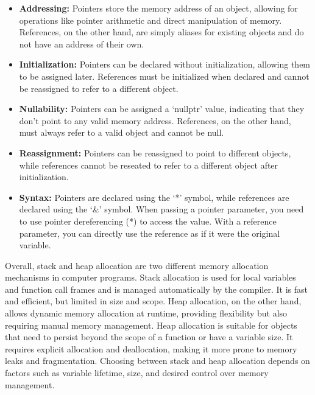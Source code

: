 \begin{itemize}
    \item \textbf{Addressing:} Pointers store the memory address of an object, allowing for operations like pointer arithmetic and direct manipulation of memory. References, on the other hand, are 
    simply aliases for existing objects and do not have an address of their own.
    \item \textbf{Initialization:} Pointers can be declared without initialization, allowing them to be assigned later. References must be initialized when declared and cannot be reassigned to refer 
    to a different object.
    \item \textbf{Nullability:} Pointers can be assigned a `nullptr' value, indicating that they don't point to any valid memory address. References, on the other hand, must always refer to a valid 
    object and cannot be null.
    \item \textbf{Reassignment:} Pointers can be reassigned to point to different objects, while references cannot be reseated to refer to a different object after initialization.
    \item \textbf{Syntax:} Pointers are declared using the `*' symbol, while references are declared using the `\&' symbol. When passing a pointer parameter, you need to use pointer dereferencing (*) 
    to access the value. With a reference parameter, you can directly use the reference as if it were the original variable.
\end{itemize}

Overall, stack and heap allocation are two different memory allocation mechanisms in computer programs. Stack allocation is used for local variables and function call frames and is managed automatically 
by the compiler. It is fast and efficient, but limited in size and scope. Heap allocation, on the other hand, allows dynamic memory allocation at runtime, providing flexibility but also requiring manual 
memory management. Heap allocation is suitable for objects that need to persist beyond the scope of a function or have a variable size. It requires explicit allocation and deallocation, making it more 
prone to memory leaks and fragmentation. Choosing between stack and heap allocation depends on factors such as variable lifetime, size, and desired control over memory management.

\clearpage